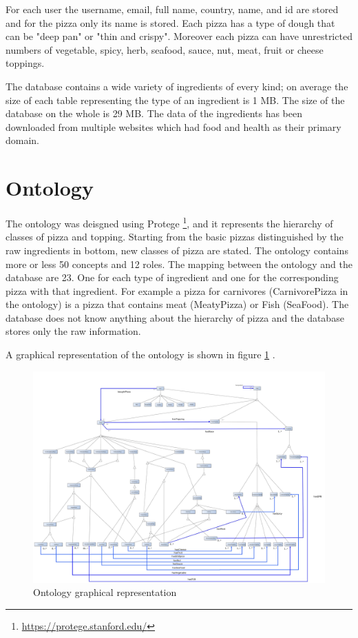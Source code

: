 \documentclass[10pt,a4paper]{article}
\begin{document}
For each user the username, email, full name, country, name, and id are stored and for the pizza only its name is stored. 
Each pizza has a type of dough that can be "deep pan"  or "thin and crispy". Moreover each pizza can have unrestricted numbers of vegetable, spicy, herb, seafood, sauce, nut, meat, fruit or cheese toppings.

The database contains a wide variety of ingredients of every kind; on average the size of each table representing the type of an ingredient is 1 MB. The size of the database on the whole is 29 MB. The data of the ingredients has been downloaded from multiple websites which had food and health as their primary domain. 

\section{Ontology}
The ontology was deisgned using Protege \footnote{\url{https://protege.stanford.edu/}}, and it represents the hierarchy of classes of pizza and topping. Starting from the basic pizzas distinguished by the raw ingredients in bottom, new classes of pizza are stated. 
The ontology contains more or less 50 concepts and 12 roles. The mapping between the ontology and the database are 23. One for each type of ingredient and one for the corresponding pizza with that ingredient. For example a pizza for carnivores (CarnivorePizza in the ontology) is a pizza that contains meat (MeatyPizza) or Fish (SeaFood).  The database does not know anything about the hierarchy of pizza and the database stores only the raw information.

A graphical representation of the ontology is shown in figure \ref{ONTO} .
\begin{figure}
  \includegraphics[width=\linewidth]{ontologygraph.jpg}
  \caption{Ontology graphical representation}
  \label{ONTO}
\end{figure}
\end{document}
